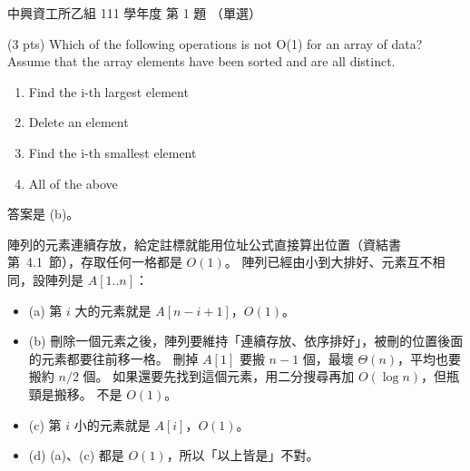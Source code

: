 \begin{pastexam}[label={px:nchu-111-is-01}]{中興資工所乙組 111 學年度 第 1 題}
（單選）

(3 pts) Which of the following operations is not O(1) for an array of data? Assume that the array elements
have been sorted and are all distinct.
\begin{enumerate}[label=(\alph*).]
\item Find the i-th largest element
\item Delete an element
\item Find the i-th smallest element
\item All of the above
\end{enumerate}
\end{pastexam}

\begin{pastsoln}
答案是 (b)。

陣列的元素連續存放，給定註標就能用位址公式直接算出位置（資結書第~4.1~節），存取任何一格都是 $O(1)$。
陣列已經由小到大排好、元素互不相同，設陣列是 $A[1..n]$：
\begin{itemize}
\item (a) 第 $i$ 大的元素就是 $A[n - i + 1]$，$O(1)$。
\item (b) 刪除一個元素之後，陣列要維持「連續存放、依序排好」，被刪的位置後面的元素都要往前移一格。 刪掉
$A[1]$ 要搬 $n - 1$ 個，最壞 $\Theta(n)$，平均也要搬約 $n/2$ 個。 如果還要先找到這個元素，用二分搜尋再加
$O(\log n)$，但瓶頸是搬移。 不是 $O(1)$。
\item (c) 第 $i$ 小的元素就是 $A[i]$，$O(1)$。
\item (d) (a)、(c) 都是 $O(1)$，所以「以上皆是」不對。
\end{itemize}
\end{pastsoln}
